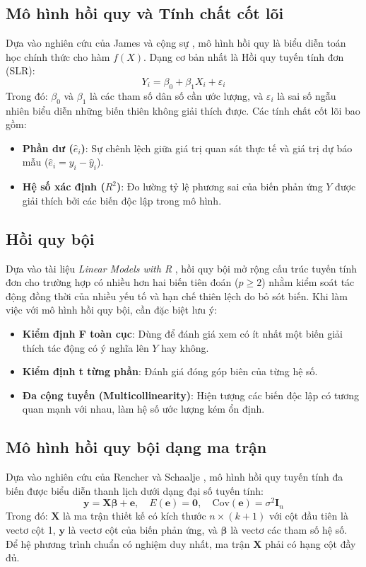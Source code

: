 \documentclass[12pt, a4paper]{article}
\begin{document}
	\subsection{Mô hình hồi quy và Tính chất cốt lõi}
	Dựa vào nghiên cứu của James và cộng sự \cite{james2013}, mô hình hồi quy là biểu diễn toán học chính thức cho hàm $f(X)$. Dạng cơ bản nhất là Hồi quy tuyến tính đơn (SLR):
	\begin{equation}
		Y_i = \beta_0 + \beta_1 X_i + \varepsilon_i
	\end{equation}
	Trong đó: $\beta_0$ và $\beta_1$ là các tham số dân số cần ước lượng, và $\varepsilon_i$ là sai số ngẫu nhiên biểu diễn những biến thiên không giải thích được. Các tính chất cốt lõi bao gồm:
	\begin{itemize}
		\item \textbf{Phần dư ($\hat{e}_i$)}: Sự chênh lệch giữa giá trị quan sát thực tế và giá trị dự báo mẫu ($\hat{e}_i = y_i - \hat{y}_i$).
		\item \textbf{Hệ số xác định ($R^2$)}: Đo lường tỷ lệ phương sai của biến phản ứng $Y$ được giải thích bởi các biến độc lập trong mô hình.
	\end{itemize}
	
	\subsection{Hồi quy bội}
	Dựa vào tài liệu \textit{Linear Models with R} \cite{faraway2016}, hồi quy bội mở rộng cấu trúc tuyến tính đơn cho trường hợp có nhiều hơn hai biến tiên đoán ($p \geq 2$) nhằm kiểm soát tác động đồng thời của nhiều yếu tố và hạn chế thiên lệch do bỏ sót biến. Khi làm việc với mô hình hồi quy bội, cần đặc biệt lưu ý:
	\begin{itemize}
		\item \textbf{Kiểm định F toàn cục}: Dùng để đánh giá xem có ít nhất một biến giải thích tác động có ý nghĩa lên $Y$ hay không.
		\item \textbf{Kiểm định t từng phần}: Đánh giá đóng góp biên của từng hệ số.
		\item \textbf{Đa cộng tuyến (Multicollinearity)}: Hiện tượng các biến độc lập có tương quan mạnh với nhau, làm hệ số ước lượng kém ổn định.
	\end{itemize}
	
	\subsection{Mô hình hồi quy bội dạng ma trận}
	Dựa vào nghiên cứu của Rencher và Schaalje \cite{rencher2008}, mô hình hồi quy tuyến tính đa biến được biểu diễn thanh lịch dưới dạng đại số tuyến tính:
	\begin{equation}
		\mathbf{y} = \mathbf{X}\boldsymbol{\beta} + \mathbf{e}, \quad E(\mathbf{e}) = \mathbf{0}, \quad \text{Cov}(\mathbf{e}) = \sigma^2 \mathbf{I}_n
	\end{equation}
	Trong đó: $\mathbf{X}$ là ma trận thiết kế có kích thước $n \times (k+1)$ với cột đầu tiên là vectơ cột 1, $\mathbf{y}$ là vectơ cột của biến phản ứng, và $\boldsymbol{\beta}$ là vectơ các tham số hệ số. Để hệ phương trình chuẩn có nghiệm duy nhất, ma trận $\mathbf{X}$ phải có hạng cột đầy đủ.
	
\end{document}
